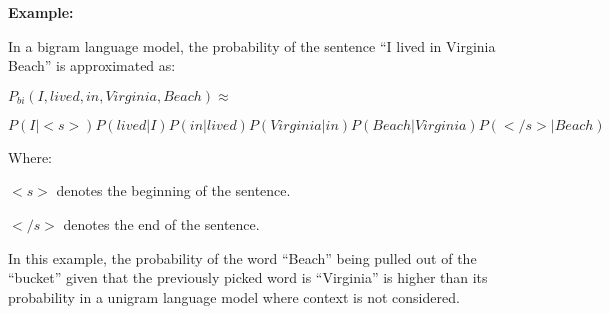 \textbf{Example:}

In a bigram language model, the probability of the sentence ``I lived in Virginia Beach'' is approximated as:

$P_{bi}(I, lived, in, Virginia, Beach) \approx $


$P(I|<s>) P(lived | I) P(in | lived) P(Virginia | in) P(Beach | Virginia) P(</s>|Beach)$

Where:

$<s>$ denotes the beginning of the sentence.

$</s>$ denotes the end of the sentence.

In this example, the probability of the word ``Beach'' being pulled out of the ``bucket'' given that the previously picked word is ``Virginia'' is higher than its probability in a unigram language model where context is not considered.
